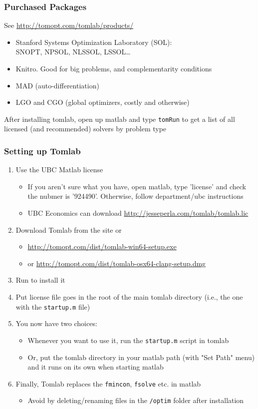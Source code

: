 \documentclass[nofootline]{etk-presentation}
\begin{document}
\begin{frame}[fragile]	\frametitle{Purchased Packages}
	See \url{http://tomopt.com/tomlab/products/}
	\begin{itemize}
		\item Stanford 
		Systems Optimization Laboratory (SOL):\\SNOPT, NPSOL, NLSSOL, LSSOL\ldots
		\item Knitro.  Good for big problems, and complementarity conditions
		\item MAD (auto-differentiation)
		\item LGO and CGO (global optimizers, costly and otherwise)
	\end{itemize}
After installing tomlab, open up matlab and type \verb!tomRun! to get a list of all licensed (and recommended) solvers by problem type
\end{frame}

\begin{frame}[fragile]	\frametitle{Setting up Tomlab}
	\begin{enumerate}
		\item Use the UBC Matlab license
		\begin{itemize}
			\item If you aren't sure what you have, open matlab, type 'license' and check the nubmer is '924490'.  Otherwise, follow department/ubc instructions
			\item UBC Economics can download \url{http://jesseperla.com/tomlab/tomlab.lic}
		\end{itemize}
		\item Download Tomlab from the site or 
		\begin{itemize}
			\item \url{http://tomopt.com/dist/tomlab-win64-setup.exe}
			\item or \url{http://tomopt.com/dist/tomlab-osx64-clang-setup.dmg}
		\end{itemize}
		\item Run to install it
		\item Put license file goes in the root of the main tomlab directory (i.e., the one with the \verb!startup.m! file)
		\item You now have two choices:
		\begin{itemize}
			\item Whenever you want to use it, run the \verb!startup.m! script in tomlab
			\item Or, put the tomlab directory in your matlab path (with "Set Path" menu) and it runs on its own when starting matlab
		\end{itemize}
	\item Finally, Tomlab replaces the \verb!fmincon!, \verb!fsolve! etc. in matlab
	\begin{itemize}
		\item Avoid by deleting/renaming files in the \verb!/optim! folder after installation
	\end{itemize}
	\end{enumerate}
\end{frame}
\end{document}
